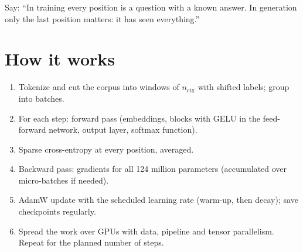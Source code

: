 \begin{sayit}
\begin{pic}
\end{pic}
Say: ``In training every position is a question with a known answer. In generation only the last position matters: it has seen everything.''
\end{sayit}

\section{How it works}
\begin{enumerate}
  \item Tokenize and cut the corpus into windows of $n_{\text{ctx}}$ with shifted labels; group into batches.
  \item For each step: forward pass (embeddings, blocks with GELU in the feed-forward network, output layer, softmax function).
  \item Sparse cross-entropy at every position, averaged.
  \item Backward pass: gradients for all 124 million parameters (accumulated over micro-batches if needed).
  \item AdamW update with the scheduled learning rate (warm-up, then decay); save checkpoints regularly.
  \item Spread the work over GPUs with data, pipeline and tensor parallelism. Repeat for the planned number of steps.
\end{enumerate}

